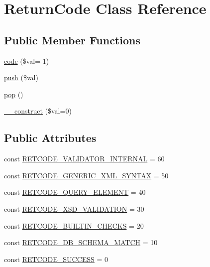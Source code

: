 \hypertarget{classReturnCode}{\section{Return\+Code Class Reference}
\label{classReturnCode}
}


 


\subsection*{Public Member Functions}
\begin{DoxyCompactItemize}
\item 
\hyperlink{classReturnCode_a4fd0b4c831333fd85f7cdf0e9e6d6801}{code} (\$val=-\/1)
\item 
\hyperlink{classReturnCode_a31c260c4a66c0d7f6de6921f01f9502d}{push} (\$val)
\item 
\hyperlink{classReturnCode_ac6f767aa41d2e8443327cfcd2b9044ff}{pop} ()
\item 
\hyperlink{classReturnCode_a131e40f79f7a90e3d49d4ccfe814a83c}{\+\_\+\+\_\+construct} (\$val=0)
\end{DoxyCompactItemize}
\subsection*{Public Attributes}
\begin{DoxyCompactItemize}
\item 
const \hyperlink{classReturnCode_ac54b7536af67019f9209e68a7c4aee68}{R\+E\+T\+C\+O\+D\+E\+\_\+\+V\+A\+L\+I\+D\+A\+T\+O\+R\+\_\+\+I\+N\+T\+E\+R\+N\+A\+L} = 60
\item 
const \hyperlink{classReturnCode_a428e8f95d23aad26927fd861b2d9d8ff}{R\+E\+T\+C\+O\+D\+E\+\_\+\+G\+E\+N\+E\+R\+I\+C\+\_\+\+X\+M\+L\+\_\+\+S\+Y\+N\+T\+A\+X} = 50
\item 
const \hyperlink{classReturnCode_a509a7443671b7b7c70856648999295f7}{R\+E\+T\+C\+O\+D\+E\+\_\+\+Q\+U\+E\+R\+Y\+\_\+\+E\+L\+E\+M\+E\+N\+T} = 40
\item 
const \hyperlink{classReturnCode_a93db5420236cb54ab9743b3147ae6eea}{R\+E\+T\+C\+O\+D\+E\+\_\+\+X\+S\+D\+\_\+\+V\+A\+L\+I\+D\+A\+T\+I\+O\+N} = 30
\item 
const \hyperlink{classReturnCode_ae9314547c8aff7d8e024e9a9d5f85785}{R\+E\+T\+C\+O\+D\+E\+\_\+\+B\+U\+I\+L\+T\+I\+N\+\_\+\+C\+H\+E\+C\+K\+S} = 20
\item 
const \hyperlink{classReturnCode_a651f0d08db704bebb1f486a2fa8d138c}{R\+E\+T\+C\+O\+D\+E\+\_\+\+D\+B\+\_\+\+S\+C\+H\+E\+M\+A\+\_\+\+M\+A\+T\+C\+H} = 10
\item 
const \hyperlink{classReturnCode_a1bfbc40c7a81cff70d885541bde528bd}{R\+E\+T\+C\+O\+D\+E\+\_\+\+S\+U\+C\+C\+E\+S\+S} = 0
\end{DoxyCompactItemize}
